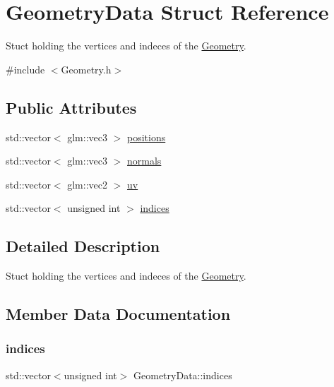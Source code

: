 \hypertarget{struct_geometry_data}{}\section{Geometry\+Data Struct Reference}
\label{struct_geometry_data}


Stuct holding the vertices and indeces of the \mbox{\hyperlink{class_geometry}{Geometry}}.  




{\ttfamily \#include $<$Geometry.\+h$>$}

\subsection*{Public Attributes}
\begin{DoxyCompactItemize}
\item 
std\+::vector$<$ glm\+::vec3 $>$ \mbox{\hyperlink{struct_geometry_data_a6376aec4b6a13ce5d3eab5c3eac93727}{positions}}
\item 
std\+::vector$<$ glm\+::vec3 $>$ \mbox{\hyperlink{struct_geometry_data_a9d5d2dc295d76c6c218238ab55cb6dfb}{normals}}
\item 
std\+::vector$<$ glm\+::vec2 $>$ \mbox{\hyperlink{struct_geometry_data_a371ee416b0a725a0079f313dc42a965e}{uv}}
\item 
std\+::vector$<$ unsigned int $>$ \mbox{\hyperlink{struct_geometry_data_ad0ed104f878c60a507229303c3627222}{indices}}
\end{DoxyCompactItemize}


\subsection{Detailed Description}
Stuct holding the vertices and indeces of the \mbox{\hyperlink{class_geometry}{Geometry}}. 



\subsection{Member Data Documentation}
\mbox{\label{struct_geometry_data_ad0ed104f878c60a507229303c3627222}} 
\subsubsection{\texorpdfstring{indices}{indices}}
{\footnotesize\ttfamily std\+::vector$<$unsigned int$>$ Geometry\+Data\+::indices}

